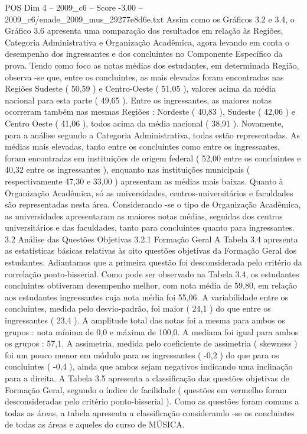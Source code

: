 \begin{textsample}{POS Dim 4 – 2009\_c6 – Score -3.00 – 2009\_c6/enade\_2009\_mus\_29277e8d6e.txt}
Assim como os Gráficos 3.2 e 3.4, o Gráfico 3.6 apresenta uma comparação dos resultados em relação às Regiões, Categoria Administrativa e Organização Acadêmica, agora levando em conta o desempenho dos ingressantes e dos concluintes no Componente Específico da prova.
Tendo como foco as notas médias dos estudantes, em determinada Região, observa -se que, entre os concluintes, as mais elevadas foram encontradas nas Regiões Sudeste ( 50,59 ) e Centro-Oeste ( 51,05 ), valores acima da média nacional para esta parte ( 49,65 ).
Entre os ingressantes, as maiores notas ocorreram também nas mesmas Regiões : Nordeste ( 40,83 ), Sudeste ( 42,06 ) e Centro Oeste ( 41,06 ), todos acima da média nacional ( 38,91 ).
Novamente, para a análise segundo a Categoria Administrativa, todas estão representadas.
As médias mais elevadas, tanto entre os concluintes como entre os ingressantes, foram encontradas em instituições de origem federal ( 52,00 entre os concluintes e 40,32 entre os ingressantes ), enquanto nas instituições municipais ( respectivamente 47,30 e 33,00 ) apresentam as médias mais baixas.
Quanto à Organização Acadêmica, só as universidades, centros-universitários e faculdades são representadas nesta área.
Considerando -se o tipo de Organização Acadêmica, as universidades apresentaram as maiores notas médias, seguidas dos centros universitários e das faculdades, tanto para concluintes quanto para ingressantes. 3.2 Análise das Questões Objetivas 3.2.1 Formação Geral A Tabela 3.4 apresenta as estatísticas básicas relativas às oito questões objetivas da Formação Geral dos estudantes.
Adiantamos que a primeira questão foi desconsiderada pelo critério da correlação ponto-bisserial.
Como pode ser observado na Tabela 3.4, os estudantes concluintes obtiveram desempenho melhor, com nota média de 59,80, em relação aos estudantes ingressantes cuja nota média foi 55,06.
A variabilidade entre os concluintes, medida pelo desvio-padrão, foi maior ( 24,1 ) do que entre os ingressantes ( 23,4 ).
A amplitude total das notas foi a mesma para ambos os grupos : nota mínima de 0,0 e máxima de 100,0.
A mediana foi igual para ambos os grupos : 57,1.
A assimetria, medida pelo coeficiente de assimetria ( skewness ) foi um pouco menor em módulo para os ingressantes ( -0,2 ) do que para os concluintes ( -0,4 ), ainda que ambos sejam negativos indicando uma inclinação para a direita.
A Tabela 3.5 apresenta a classificação das questões objetivas de Formação Geral, segundo o índice de facilidade ( questões em vermelho foram desconsideradas pelo critério ponto-bisserial ).
Como as questões foram comuns a todas as áreas, a tabela apresenta a classificação considerando -se os concluintes de todas as áreas e aqueles do curso de MÚSICA.

\end{textsample}
